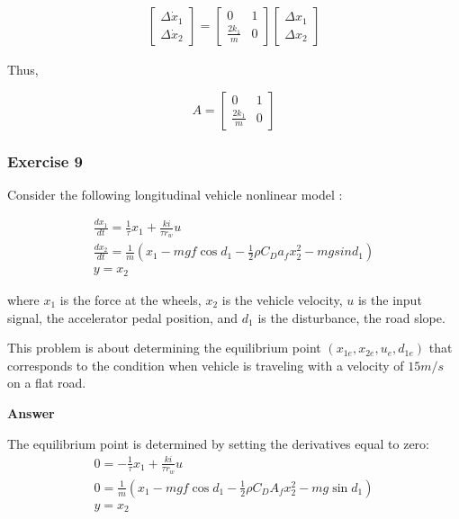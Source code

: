 \begin{eqnarray}
\begin{bmatrix}
 \Delta \dot{x}_1\\
 \Delta \dot{x}_2
\end{bmatrix}= 
\begin{bmatrix}
 0 & 1   \\
 \frac{2k_1}{m} & 0 
\end{bmatrix}
\begin{bmatrix}
 \Delta x_1  \\
 \Delta x_2  
\end{bmatrix} \nonumber
\end{eqnarray}

Thus,

\begin{equation}
A = 
\begin{bmatrix}
 0 & 1   \\
 \frac{2k_1}{m} & 0 
\end{bmatrix}
\nonumber
\end{equation}

\subsubsection{Exercise 9}

Consider the following longitudinal vehicle nonlinear model : 

\begin{eqnarray}
\frac{d x_1}{dt} = \frac{1}{\tau}x_1 + \frac{ki}{\tau r_w}u \nonumber \\
\frac{d x_2}{dt} = \frac{1}{m} (x_1 - mgf\cos d_1 - \frac{1}{2}\rho C_D a_f x_{2}^2 - mgsin d_1 ) \nonumber \\
y = x_2 \nonumber
\end{eqnarray}

where $x_1$ is the force at the wheels, $x_2$ is the vehicle velocity, $u$ is the input signal, the accelerator pedal position, and $d_1$ is the disturbance, the road slope.

This problem is about determining the equilibrium point $(x_{1e}, x_{2e}, u_e, d_{1e})$ that corresponds to the condition when vehicle is traveling with a velocity of $15 m/s$ on a flat road.

\textbf{Answer}

The equilibrium point is determined by setting the derivatives equal to zero: 
\begin{eqnarray}
0 = -\frac{1}{\tau}x_1+\frac{ki}{\tau r_w}u \nonumber \\
0 =\frac{1}{m}\left ( x_1-mgf\cos{d_1}-\frac{1}{2}\rho C_D A_f x^2_2-mg\sin{d_1}\right ) \nonumber\\
y =x_2 \nonumber 
\end{eqnarray}

